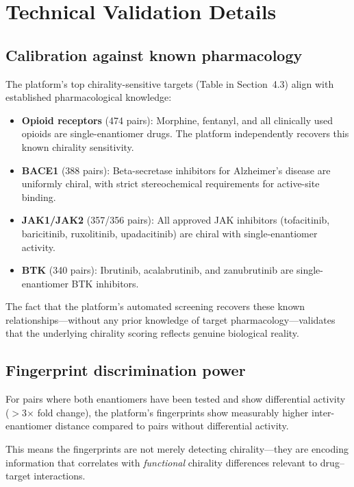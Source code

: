\documentclass[11pt,a4paper]{article}
\begin{document}
\newpage

\section{Technical Validation Details}

\subsection{Calibration against known pharmacology}

The platform's top chirality-sensitive targets (Table in Section~4.3) align
with established pharmacological knowledge:

\begin{itemize}[leftmargin=1.5em]
  \item \textbf{Opioid receptors} (474 pairs): Morphine, fentanyl, and all
    clinically used opioids are single-enantiomer drugs. The platform
    independently recovers this known chirality sensitivity.
  \item \textbf{BACE1} (388 pairs): Beta-secretase inhibitors for Alzheimer's
    disease are uniformly chiral, with strict stereochemical requirements for
    active-site binding.
  \item \textbf{JAK1/JAK2} (357/356 pairs): All approved JAK inhibitors
    (tofacitinib, baricitinib, ruxolitinib, upadacitinib) are chiral with
    single-enantiomer activity.
  \item \textbf{BTK} (340 pairs): Ibrutinib, acalabrutinib, and zanubrutinib
    are single-enantiomer BTK inhibitors.
\end{itemize}

The fact that the platform's automated screening recovers these known
relationships---without any prior knowledge of target pharmacology---validates
that the underlying chirality scoring reflects genuine biological reality.

\subsection{Fingerprint discrimination power}

For pairs where both enantiomers have been tested and show differential activity
($>$3$\times$ fold change), the platform's fingerprints show measurably higher
inter-enantiomer distance compared to pairs without differential activity.

This means the fingerprints are not merely detecting chirality---they are
encoding information that correlates with \textit{functional} chirality
differences relevant to drug--target interactions.
\end{document}

